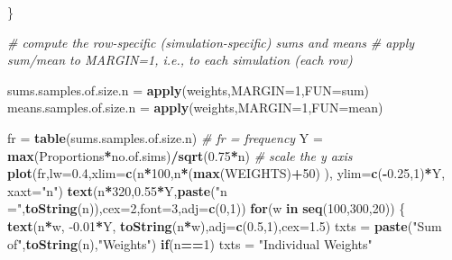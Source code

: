 \documentclass[]{book}
\newenvironment{Shaded}{\begin{snugshade}}{\end{snugshade}}
\newcommand{\CommentTok}[1]{\textcolor[rgb]{0.56,0.35,0.01}{\textit{#1}}}
\newcommand{\ControlFlowTok}[1]{\textcolor[rgb]{0.13,0.29,0.53}{\textbf{#1}}}
\newcommand{\DataTypeTok}[1]{\textcolor[rgb]{0.13,0.29,0.53}{#1}}
\newcommand{\DecValTok}[1]{\textcolor[rgb]{0.00,0.00,0.81}{#1}}
\newcommand{\FloatTok}[1]{\textcolor[rgb]{0.00,0.00,0.81}{#1}}
\newcommand{\KeywordTok}[1]{\textcolor[rgb]{0.13,0.29,0.53}{\textbf{#1}}}
\newcommand{\NormalTok}[1]{#1}
\newcommand{\OperatorTok}[1]{\textcolor[rgb]{0.81,0.36,0.00}{\textbf{#1}}}
\newcommand{\StringTok}[1]{\textcolor[rgb]{0.31,0.60,0.02}{#1}}
\begin{document}
\begin{Shaded}
\begin{Highlighting}[]
\NormalTok{   \} }
  
   \CommentTok{# compute the row-specific (simulation-specific) sums and means}
   \CommentTok{# apply sum/mean to MARGIN=1, i.e., to each simulation (each row)}

\NormalTok{   sums.samples.of.size.n =}\StringTok{ }\KeywordTok{apply}\NormalTok{(weights,}\DataTypeTok{MARGIN=}\DecValTok{1}\NormalTok{,}\DataTypeTok{FUN=}\NormalTok{sum)}
\NormalTok{   means.samples.of.size.n =}\StringTok{ }\KeywordTok{apply}\NormalTok{(weights,}\DataTypeTok{MARGIN=}\DecValTok{1}\NormalTok{,}\DataTypeTok{FUN=}\NormalTok{mean)}

\NormalTok{   fr =}\StringTok{ }\KeywordTok{table}\NormalTok{(sums.samples.of.size.n)          }\CommentTok{# fr = frequency}
\NormalTok{   Y =}\StringTok{ }\KeywordTok{max}\NormalTok{(Proportions}\OperatorTok{*}\NormalTok{no.of.sims)}\OperatorTok{/}\KeywordTok{sqrt}\NormalTok{(}\FloatTok{0.75}\OperatorTok{*}\NormalTok{n) }\CommentTok{# scale the y axis}
   \KeywordTok{plot}\NormalTok{(fr,}\DataTypeTok{lw=}\FloatTok{0.4}\NormalTok{,}\DataTypeTok{xlim=}\KeywordTok{c}\NormalTok{(n}\OperatorTok{*}\DecValTok{100}\NormalTok{,n}\OperatorTok{*}\NormalTok{(}\KeywordTok{max}\NormalTok{(WEIGHTS)}\OperatorTok{+}\DecValTok{50}\NormalTok{) ), }
                  \DataTypeTok{ylim=}\KeywordTok{c}\NormalTok{(}\OperatorTok{-}\FloatTok{0.25}\NormalTok{,}\DecValTok{1}\NormalTok{)}\OperatorTok{*}\NormalTok{Y, }\DataTypeTok{xaxt=}\StringTok{"n"}\NormalTok{)}
   \KeywordTok{text}\NormalTok{(n}\OperatorTok{*}\DecValTok{320}\NormalTok{,}\FloatTok{0.55}\OperatorTok{*}\NormalTok{Y,}\KeywordTok{paste}\NormalTok{(}\StringTok{"n ="}\NormalTok{,}\KeywordTok{toString}\NormalTok{(n)),}\DataTypeTok{cex=}\DecValTok{2}\NormalTok{,}\DataTypeTok{font=}\DecValTok{3}\NormalTok{,}\DataTypeTok{adj=}\KeywordTok{c}\NormalTok{(}\DecValTok{0}\NormalTok{,}\DecValTok{1}\NormalTok{))}
   \ControlFlowTok{for}\NormalTok{(w }\ControlFlowTok{in} \KeywordTok{seq}\NormalTok{(}\DecValTok{100}\NormalTok{,}\DecValTok{300}\NormalTok{,}\DecValTok{20}\NormalTok{)) \{}
     \KeywordTok{text}\NormalTok{(n}\OperatorTok{*}\NormalTok{w, }\FloatTok{-0.01}\OperatorTok{*}\NormalTok{Y, }\KeywordTok{toString}\NormalTok{(n}\OperatorTok{*}\NormalTok{w),}\DataTypeTok{adj=}\KeywordTok{c}\NormalTok{(}\FloatTok{0.5}\NormalTok{,}\DecValTok{1}\NormalTok{),}\DataTypeTok{cex=}\FloatTok{1.5}\NormalTok{)}
\NormalTok{     txts =}\StringTok{ }\KeywordTok{paste}\NormalTok{(}\StringTok{"Sum of"}\NormalTok{,}\KeywordTok{toString}\NormalTok{(n),}\StringTok{"Weights"}\NormalTok{)}
     \ControlFlowTok{if}\NormalTok{(n}\OperatorTok{==}\DecValTok{1}\NormalTok{) txts =}\StringTok{ "Individual Weights"}

\end{Highlighting}
\end{Shaded}
\end{document}

